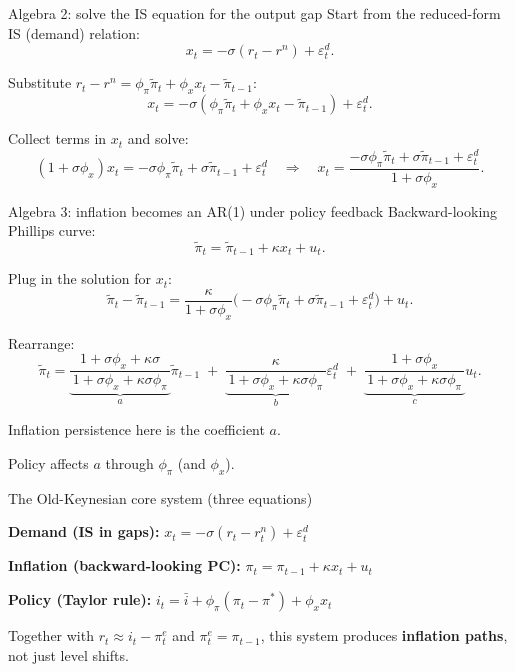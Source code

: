 \documentclass[aspectratio=169,xcolor=dvipsnames]{beamer}
\let\tempone\itemize
\let\temptwo\enditemize
\renewenvironment{itemize}{\tempone\addtolength{\itemsep}{\fill}}{\temptwo}
\let\tempa\enumerate
\let\tempb\endenumerate
\renewenvironment{enumerate}{\tempa\addtolength{\itemsep}{\fill}}{\tempb}
\begin{document}
\begin{frame}{Algebra 2: solve the IS equation for the output gap}
\small
Start from the reduced-form IS (demand) relation:
\[
x_t=-\sigma(r_t-r^{n})+\varepsilon_t^{d}.
\]

Substitute $r_t-r^{n}=\phi_{\pi}\tilde\pi_t+\phi_x x_t-\tilde\pi_{t-1}$:
\[
x_t=-\sigma(\phi_{\pi}\tilde\pi_t+\phi_x x_t-\tilde\pi_{t-1})+\varepsilon_t^{d}.
\]

Collect terms in $x_t$ and solve:
\[
(1+\sigma\phi_x)x_t=-\sigma\phi_{\pi}\tilde\pi_t+\sigma\tilde\pi_{t-1}+\varepsilon_t^{d}
\quad\Rightarrow\quad
x_t=\frac{-\sigma\phi_{\pi}\tilde\pi_t+\sigma\tilde\pi_{t-1}+\varepsilon_t^{d}}{1+\sigma\phi_x}.
\]
\end{frame}

\begin{frame}{Algebra 3: inflation becomes an AR(1) under policy feedback}
\small
Backward-looking Phillips curve:
\[
\tilde\pi_t=\tilde\pi_{t-1}+\kappa x_t+u_t.
\]

Plug in the solution for $x_t$:
\[
\tilde\pi_t-\tilde\pi_{t-1}
=\frac{\kappa}{1+\sigma\phi_x}\Big(-\sigma\phi_{\pi}\tilde\pi_t+\sigma\tilde\pi_{t-1}+\varepsilon_t^{d}\Big)+u_t.
\]

Rearrange:
\[
\tilde\pi_t
=
\underbrace{\frac{1+\sigma\phi_x+\kappa\sigma}{\,1+\sigma\phi_x+\kappa\sigma\phi_{\pi}\,}}_{\displaystyle a}
\tilde\pi_{t-1}
\;+\;
\underbrace{\frac{\kappa}{\,1+\sigma\phi_x+\kappa\sigma\phi_{\pi}\,}}_{\displaystyle b}\varepsilon_t^{d}
\;+\;
\underbrace{\frac{1+\sigma\phi_x}{\,1+\sigma\phi_x+\kappa\sigma\phi_{\pi}\,}}_{\displaystyle c}u_t.
\]

\begin{itemize}
\item Inflation persistence here is the coefficient $a$.
\item Policy affects $a$ through $\phi_{\pi}$ (and $\phi_x$).
\end{itemize}
\end{frame}

\begin{frame}{The Old-Keynesian core system (three equations)}
\small
\begin{enumerate}
\item \textbf{Demand (IS in gaps):} \quad $x_t = -\sigma(r_t-r_t^{n}) + \varepsilon_t^{d}$
\item \textbf{Inflation (backward-looking PC):} \quad $\pi_t = \pi_{t-1} + \kappa x_t + u_t$
\item \textbf{Policy (Taylor rule):} \quad $i_t = \bar{i}+\phi_{\pi}(\pi_t-\pi^{*})+\phi_x x_t$
\end{enumerate}

\vspace{0.4em}
\small
Together with $r_t \approx i_t - \pi_t^{e}$ and $\pi_t^{e}=\pi_{t-1}$, this system produces \textbf{inflation paths}, not just level shifts.
\end{frame}
\end{document}
